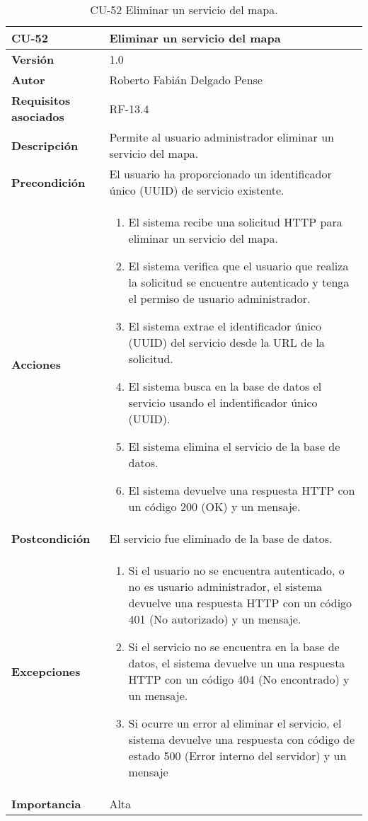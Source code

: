 \begin{table}[p]
	\centering
	\begin{tabularx}{\linewidth}{ p{} p{} }
		\toprule
		\textbf{CU-52}    & \textbf{Eliminar un servicio del mapa}\\
		\toprule
		\textbf{Versión}              & 1.0    \\
		\textbf{Autor}                & Roberto Fabián Delgado Pense \\
		\textbf{Requisitos asociados} & RF-13.4 \\ 
		\textbf{Descripción}          & Permite al usuario administrador eliminar un servicio del mapa. \\
		\textbf{Precondición}         & El usuario ha proporcionado un identificador único (UUID) de servicio existente.\\
		\textbf{Acciones}             &
		\begin{enumerate}
			\def\labelenumi{\arabic{enumi}.}
			\tightlist
			\item El sistema recibe una solicitud HTTP para eliminar un servicio del mapa.
                   \item El sistema verifica que el usuario que realiza la solicitud se encuentre autenticado y tenga el permiso de usuario administrador.
			\item El sistema extrae el identificador único (UUID) del servicio desde la URL de la solicitud.
                \item El sistema busca en la base de datos el servicio usando el indentificador único (UUID).
                \item El sistema elimina el servicio de la base de datos.
                \item El sistema devuelve una respuesta HTTP con un código 200 (OK) y un mensaje.
            \end{enumerate}\\
		\textbf{Postcondición}        & El servicio fue eliminado de la base de datos.\\
		\textbf{Excepciones}          & 
            \begin{enumerate}
			\def\labelenumi{\arabic{enumi}.}
			\tightlist
   			\item Si el usuario no se encuentra autenticado, o no es usuario administrador, el sistema devuelve una                 respuesta HTTP con un código 401 (No autorizado) y un mensaje.
                \item   Si el servicio no se encuentra en la base de datos, el sistema devuelve un                           una respuesta HTTP con un código 404 (No encontrado) y un mensaje. 
                \item Si ocurre un error al eliminar el servicio, el sistema devuelve una respuesta con código de estado 500 (Error interno del servidor) y un mensaje
            \end{enumerate}\\
		\textbf{Importancia}          & Alta \\
		\bottomrule
	\end{tabularx}
	\caption{CU-52 Eliminar un servicio del mapa.}
\end{table}

